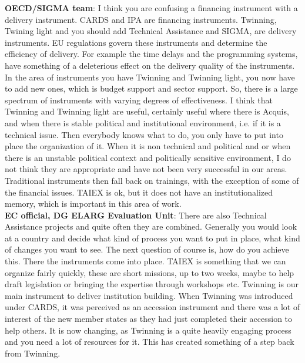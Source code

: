 \textbf{OECD/SIGMA team}: I think you are confusing a financing instrument with a delivery instrument. CARDS and IPA are financing instruments. Twinning, Twining light and you should add Technical Assistance and SIGMA, are delivery instruments. EU regulations govern these instruments and determine the efficiency of delivery. For example the time delays and the programming systems, have something of a deleterious effect on the delivery quality of the instruments. In the area of instruments you have Twinning and Twinning light, you now have to add new ones, which is budget support and sector support. So, there is a large spectrum of instruments with varying degrees of effectiveness. I think that Twinning and Twinning light are useful, certainly useful where there is Acquis, and when there is stable political and institutional environment, i.e. if it is a technical issue. Then everybody knows what to do, you only have to put into place the organization of it. When it is non technical and political and or when there is an unstable political context and politically sensitive environment, I do not think they are appropriate and have not been very successful in our areas. Traditional instruments then fall back on trainings, with the exception of some of the financial issues. TAIEX is ok, but it does not have an institutionalized memory, which is important in this area of work.\\
\textbf{EC official, DG ELARG Evaluation Unit}: There are also Technical Assistance projects and quite often they are combined. Generally you would look at a country and decide what kind of process you want to put in place, what kind of changes you want to see. The next question of course is, how do you achieve this. There the instruments come into place. TAIEX is something that we can organize fairly quickly, these are short missions, up to two weeks, maybe to help draft legislation or bringing the expertise through workshops etc. Twinning is our main instrument to deliver institution building. When Twinning was introduced under CARDS, it was perceived as an accession instrument and there was a lot of interest of the new member states as they had just completed their accession to help others. It is now changing, as Twinning is a quite heavily engaging process and you need a lot of resources for it. This has created something of a step back from Twinning.\\ 
